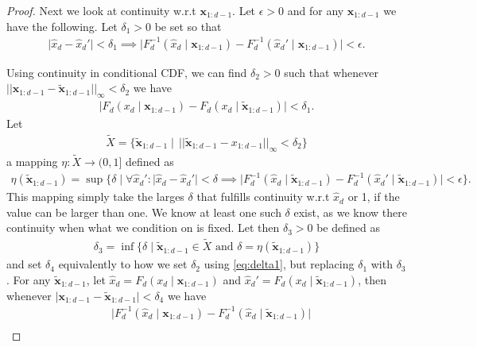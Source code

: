 \begin{proof}
    Next we look at continuity w.r.t \(\bm x_{1:d-1}\). Let \(\epsilon > 0\) and for any \(\bm x_{1:d-1}\) we have the following. Let \(\delta_1 > 0\) be set so that 
    \begin{align*}
        \lvert \hat{x}_d - \hat{x}_d'\rvert < \delta_1 \implies \lvert F_d^{-1}(\hat{x}_d \mid \bm x_{1:d-1}) - F_d^{-1}(\hat{x}_d' \mid  \bm x_{1:d-1})\rvert <\epsilon.
    \end{align*}

    Using continuity in conditional CDF, we can find \(\delta_2 > 0\) such that whenever \(\lvert\lvert \bm x_{1:d-1} - \tilde{\bm x}_{1:d-1} \rvert\rvert_{\infty} < \delta_2\) we have
    \begin{align}\label{eq:delta1}
        \lvert F_d(x_d \mid \bm x_{1:d-1}) - F_d(x_d \mid \tilde{\bm x}_{1:d-1})\rvert < \delta_1.
    \end{align}
    Let 
    \begin{align*}
        \tilde X = \{\tilde{\bm x}_{1:d-1} \mid \, \lvert\lvert \tilde{\bm x}_{1:d-1} - x_{1:d-1} \rvert\rvert_{\infty} < \delta_2\}
    \end{align*}
    a mapping \(\eta\colon \tilde X \to (0, 1]\) defined as 
    \begin{align*}
        \eta(\tilde{\bm x}_{1:d-1}) = \sup\{\delta \mid \forall \hat{x}_d':\lvert \hat{x}_d - \hat{x}_d' \rvert < \delta \implies \lvert F_d^{-1}(\hat{x}_d \mid \tilde{\bm x}_{1:d-1}) - 
        F_d^{-1}(\hat{x}_d' \mid \tilde{\bm x}_{1:d-1}) \rvert < \epsilon\}.
    \end{align*}
    This mapping simply take the larges \(\delta\) that fulfills continuity w.r.t \(\hat{x}_d\) or 1, if the value can be larger than one. We know at least one
    such \(\delta\) exist, as we know there continuity when what we condition on is fixed.
    Let then \(\delta_3 > 0\) be defined as
    \begin{align*}
        \delta_3 = \inf\{\delta \mid \tilde{\bm x}_{1:d-1} \in \tilde X \text{ and } \delta = \eta(\tilde{\bm x}_{1:d-1})\}
    \end{align*}
    and set \(\delta_4\) equivalently to how we set \(\delta_2\) using \cref{eq:delta1}, but replacing \(\delta_1\) with \(\delta_3\). 
    For any \(\tilde{\bm x}_{1:d-1}\), let \(\hat{x}_d = F_d(x_d \mid \bm x_{1:d-1})\) and \(\hat{x}_d' = F_d(x_d\mid \tilde{\bm x}_{1:d-1})\), then
    whenever \(\lvert \bm x_{1:d-1} - \tilde{\bm x}_{1:d-1} \rvert < \delta_4\) we have
    \begin{align*}
        &\lvert F_d^{-1}(\hat{x}_d \mid \bm x_{1:d-1}) - F_d^{-1}(\hat{x}_d \mid \tilde{\bm x}_{1:d-1})\rvert\\

\end{align*}
\end{proof}
